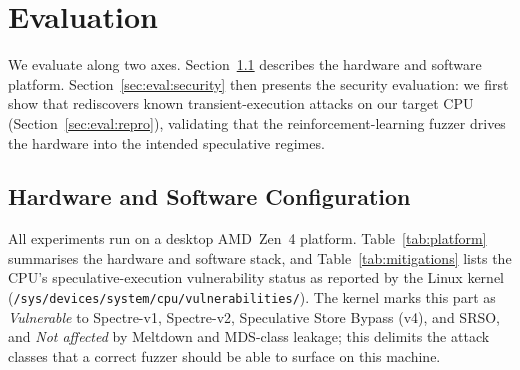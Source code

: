 
\section{Evaluation}
\label{sec:eval}

We evaluate \tool along two axes.
Section~\ref{sec:eval:config} describes the hardware and software platform.
Section~\ref{sec:eval:security} then presents the security evaluation:
we first show that \tool rediscovers known transient-execution attacks
on our target CPU (Section~\ref{sec:eval:repro}), validating that the
reinforcement-learning fuzzer drives the hardware into the intended
speculative regimes.

\subsection{Hardware and Software Configuration}
\label{sec:eval:config}

All experiments run on a desktop AMD~Zen~4 platform.
Table~\ref{tab:platform} summarises the hardware and software stack, and
Table~\ref{tab:mitigations} lists the CPU's speculative-execution
vulnerability status as reported by the Linux kernel
(\texttt{/sys/devices/system/cpu/vulnerabilities/}).
The kernel marks this part as \emph{Vulnerable} to Spectre-v1, Spectre-v2,
Speculative Store Bypass (v4), and SRSO, and \emph{Not affected} by
Meltdown and MDS-class leakage; this delimits the attack classes that a
correct fuzzer should be able to surface on this machine.

